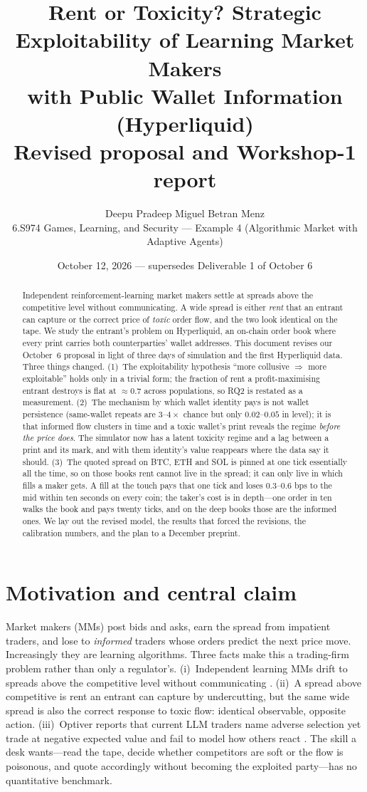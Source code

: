 \documentclass[11pt]{article}
\title{\textbf{Rent or Toxicity? Strategic Exploitability of Learning Market Makers\\ with Public Wallet Information (Hyperliquid)}\\[0.4em]
\large Revised proposal and Workshop-1 report}
\author{Deepu Pradeep \quad Miguel Betran Menz \\
\normalsize 6.S974 Games, Learning, and Security --- Example 4 (Algorithmic Market with Adaptive Agents)}
\date{October 12, 2026 --- supersedes Deliverable 1 of October 6}
\begin{document}
\maketitle

\begin{abstract}
\noindent Independent reinforcement-learning market makers settle at spreads above the competitive level without communicating. A wide spread is either \emph{rent} that an entrant can capture or the correct price of \emph{toxic} order flow, and the two look identical on the tape. We study the entrant's problem on Hyperliquid, an on-chain order book where every print carries both counterparties' wallet addresses. This document revises our October~6 proposal in light of three days of simulation and the first Hyperliquid data. Three things changed. (1)~The exploitability hypothesis ``more collusive $\Rightarrow$ more exploitable'' holds only in a trivial form; the fraction of rent a profit-maximising entrant destroys is flat at $\approx 0.7$ across populations, so RQ2 is restated as a measurement. (2)~The mechanism by which wallet identity pays is not wallet persistence (same-wallet repeats are $3$--$4\times$ chance but only $0.02$--$0.05$ in level); it is that informed flow clusters in time and a toxic wallet's print reveals the regime \emph{before the price does}. The simulator now has a latent toxicity regime and a lag between a print and its mark, and with them identity's value reappears where the data say it should. (3)~The quoted spread on BTC, ETH and SOL is pinned at one tick essentially all the time, so on those books rent cannot live in the spread; it can only live in which fills a maker gets. A fill at the touch pays that one tick and loses $0.3$--$0.6$ bps to the mid within ten seconds on every coin; the taker's cost is in depth---one order in ten walks the book and pays twenty ticks, and on the deep books those are the informed ones. We lay out the revised model, the results that forced the revisions, the calibration numbers, and the plan to a December preprint.
\end{abstract}

\section{Motivation and central claim}
Market makers (MMs) post bids and asks, earn the spread from impatient traders, and lose to \emph{informed} traders whose orders predict the next price move. Increasingly they are learning algorithms. Three facts make this a trading-firm problem rather than only a regulator's. (i)~Independent learning MMs drift to spreads above the competitive level without communicating \cite{contxiong,cfl}. (ii)~A spread above competitive is rent an entrant can capture by undercutting, but the same wide spread is also the correct response to toxic flow: identical observable, opposite action. (iii)~Optiver reports that current LLM traders name adverse selection yet trade at negative expected value and fail to model how others react \cite{optiver}. The skill a desk wants---read the tape, decide whether competitors are soft or the flow is poisonous, and quote accordingly without becoming the exploited party---has no quantitative benchmark.
\end{document}

